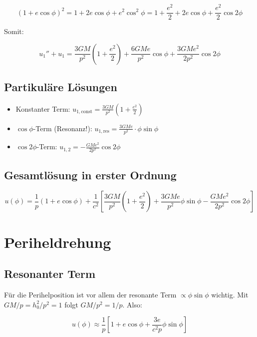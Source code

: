 \[
(1 + e \cos \phi)^2 = 1 + 2e \cos \phi + e^2 \cos^2 \phi
= 1 + \frac{e^2}{2} + 2e \cos \phi + \frac{e^2}{2} \cos 2\phi
\]

Somit:

\[
u_1'' + u_1 = \frac{3GM}{p^2} \left(1 + \frac{e^2}{2}\right) 
+ \frac{6GM e}{p^2} \cos \phi 
+ \frac{3GM e^2}{2p^2} \cos 2\phi
\]

\subsection{Partikuläre Lösungen}
\label{sub:periheldrehung_partikulaer}

\begin{itemize}
    \item Konstanter Term: \( u_{1,\text{const}} = \frac{3GM}{p^2} \left(1 + \frac{e^2}{2}\right) \)
    \item \( \cos \phi \)-Term (Resonanz!): 
          \( u_{1,\text{res}} = \frac{3GM e}{p^2} \cdot \phi \sin \phi \)
    \item \( \cos 2\phi \)-Term: 
          \( u_{1,2} = -\frac{GM e^2}{2p^2} \cos 2\phi \)
\end{itemize}

\subsection{Gesamtlösung in erster Ordnung}
\label{sub:periheldrehung_gesamtloesung}

\[
u(\phi) = \frac{1}{p} (1 + e \cos \phi) 
+ \frac{1}{c^2} \left[ \frac{3GM}{p^2} \left(1 + \frac{e^2}{2}\right) 
+ \frac{3GM e}{p^2} \phi \sin \phi 
- \frac{GM e^2}{2p^2} \cos 2\phi \right]
\]

\section{Periheldrehung}
\label{app:periheldrehung_perihel}

\subsection{Resonanter Term}
\label{sub:periheldrehung_resonanz}

Für die Perihelposition ist vor allem der resonante Term 
\( \propto \phi \sin \phi \) wichtig. Mit \( GM/p = h_0^2/p^2 = 1 \) 
folgt \( GM/p^2 = 1/p \). Also:

\[
u(\phi) \approx \frac{1}{p} \left[ 1 + e \cos \phi + \frac{3e}{c^2 p} \phi \sin \phi \right]
\]

